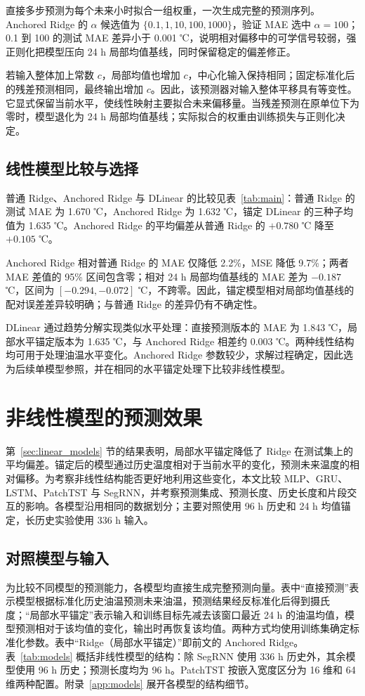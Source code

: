 \documentclass[UTF8,a4paper,11pt,fontset=windows]{ctexart}
\begin{document}
直接多步预测为每个未来小时拟合一组权重，一次生成完整的预测序列。Anchored Ridge 的 $\alpha$ 候选值为 $\{0.1,1,10,100,1000\}$，验证 MAE 选中 $\alpha=100$；0.1 到 100 的测试 MAE 差异小于 0.001 ℃，说明相对偏移中的可学信号较弱，强正则化把模型压向 24 h 局部均值基线，同时保留稳定的偏差修正。

若输入整体加上常数 $c$，局部均值也增加 $c$，中心化输入保持相同；固定标准化后的残差预测相同，最终输出增加 $c$。因此，该预测器对输入整体平移具有等变性。它显式保留当前水平，使线性映射主要拟合未来偏移量。当残差预测在原单位下为零时，模型退化为 24 h 局部均值基线；实际拟合的权重由训练损失与正则化决定。

\subsection{线性模型比较与选择}
普通 Ridge、Anchored Ridge 与 DLinear 的比较见表~\ref{tab:main}：普通 Ridge 的测试 MAE 为 1.670 ℃，Anchored Ridge 为 1.632 ℃，锚定 DLinear 的三种子均值为 1.635 ℃。Anchored Ridge 的平均偏差从普通 Ridge 的 $+0.780$ ℃ 降至 $+0.105$ ℃。

Anchored Ridge 相对普通 Ridge 的 MAE 仅降低 2.2\%，MSE 降低 9.7\%；两者 MAE 差值的 95\% 区间包含零；相对 24 h 局部均值基线的 MAE 差为 $-0.187$ ℃，区间为 $[-0.294,-0.072]$ ℃，不跨零。因此，锚定模型相对局部均值基线的配对误差差异较明确；与普通 Ridge 的差异仍有不确定性。

DLinear 通过趋势分解实现类似水平处理：直接预测版本的 MAE 为 1.843 ℃，局部水平锚定版本为 1.635 ℃，与 Anchored Ridge 相差约 0.003 ℃。两种线性结构均可用于处理油温水平变化。Anchored Ridge 参数较少，求解过程确定，因此选为后续单模型参照，并在相同的水平锚定处理下比较非线性模型。

\section{非线性模型的预测效果}
第~\ref{sec:linear_models} 节的结果表明，局部水平锚定降低了 Ridge 在测试集上的平均偏差。锚定后的模型通过历史温度相对于当前水平的变化，预测未来温度的相对偏移。为考察非线性结构能否更好地利用这些变化，本文比较 MLP、GRU、LSTM、PatchTST 与 SegRNN，并考察预测集成、预测长度、历史长度和片段交互的影响。各模型沿用相同的数据划分；主要对照使用 96 h 历史和 24 h 均值锚定，长历史实验使用 336 h 输入。

\subsection{对照模型与输入}
为比较不同模型的预测能力，各模型均直接生成完整预测向量。表中“直接预测”表示模型根据标准化历史油温预测未来油温，预测结果经反标准化后得到摄氏度；“局部水平锚定”表示输入和训练目标先减去该窗口最近 24 h 的油温均值，模型预测相对于该均值的变化，输出时再恢复该均值。两种方式均使用训练集确定标准化参数。表中“Ridge（局部水平锚定）”即前文的 Anchored Ridge。表~\ref{tab:models} 概括非线性模型的结构：除 SegRNN 使用 336 h 历史外，其余模型使用 96 h 历史；预测长度均为 96 h。PatchTST 按嵌入宽度区分为 16 维和 64 维两种配置。附录~\ref{app:models} 展开各模型的结构细节。
\end{document}
